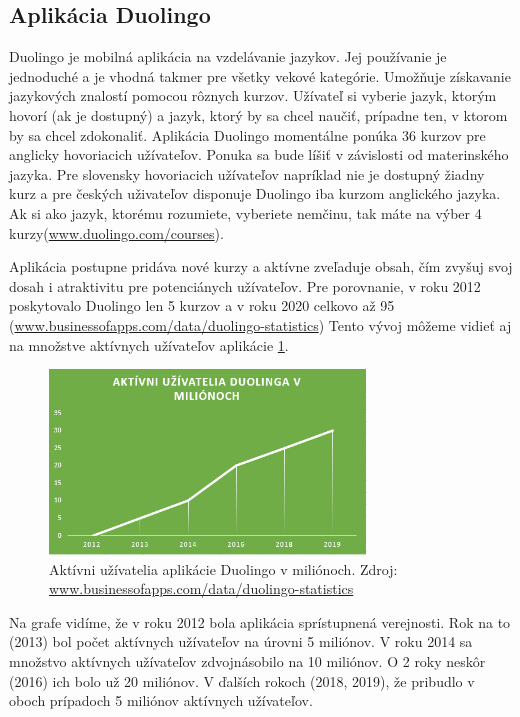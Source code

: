 \documentclass[10pt,oneside,slovak,a4paper]{article}
\begin{document}
\subsection{Aplikácia Duolingo}%
Duolingo je mobilná aplikácia na vzdelávanie jazykov. Jej používanie je jednoduché a je vhodná takmer pre všetky vekové kategórie\cite{duolingo}. Umožňuje získavanie jazykových znalostí pomocou rôznych kurzov. Užívateľ si vyberie jazyk, ktorým hovorí (ak je dostupný) a jazyk, ktorý by sa chcel naučiť, prípadne ten, v ktorom by sa chcel zdokonaliť. Aplikácia Duolingo momentálne ponúka 36 kurzov pre anglicky hovoriacich užívateľov. Ponuka sa bude líšiť v závislosti od materinského jazyka. Pre slovensky hovoriacich užívateľov napríklad nie je dostupný žiadny kurz a pre českých uživateľov disponuje Duolingo iba kurzom anglického jazyka. Ak si ako jazyk, ktorému rozumiete, vyberiete nemčinu, tak máte na výber 4 kurzy(\href{https://www.duolingo.com/courses}{www.duolingo.com/courses}).

Aplikácia postupne pridáva nové kurzy a aktívne zveľaduje obsah, čím zvyšuj svoj dosah i atraktivitu pre potenciánych užívateľov. Pre porovnanie, v roku 2012 poskytovalo Duolingo len 5 kurzov a v roku 2020 celkovo až 95 (\href{https://www.businessofapps.com/data/duolingo-statistics/}{www.businessofapps.com/data/duolingo-statistics}) Tento vývoj môžeme vidieť aj na množstve aktívnych užívateľov aplikácie \ref{duo-uzivatelia}.

\begin{figure}[h] %
\centering
\includegraphics[width=0.75\textwidth,height=0.3\textheight]{duolingo.png}
\caption{ Aktívni užívatelia aplikácie Duolingo v miliónoch.
Zdroj: \href{https://www.businessofapps.com/data/duolingo-statistics/}{www.businessofapps.com/data/duolingo-statistics}}
\label{duo-uzivatelia}
\end{figure}

Na grafe vidíme, že v roku 2012 bola aplikácia sprístupnená verejnosti. Rok na to (2013) bol počet aktívnych užívateľov na úrovni 5 miliónov. V roku 2014 sa množstvo aktívnych užívateľov zdvojnásobilo na 10 miliónov. O 2 roky neskôr (2016) ich bolo už 20 miliónov. V ďalších rokoch (2018, 2019), že pribudlo v oboch prípadoch 5 miliónov aktívnych užívateľov.
\end{document}
